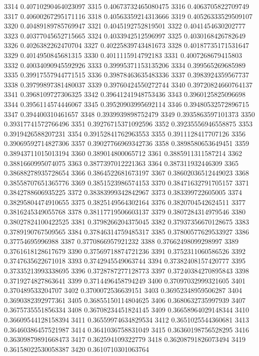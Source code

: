 3314 0.40710290464023097
3315 0.40673732465080475
3316 0.4063705822709749
3317 0.40600267295171116
3318 0.40563359214313666
3319 0.40526333529509107
3320 0.40489189785769947
3321 0.4045192752819501
3322 0.4041454630202777
3323 0.40377045652715665
3324 0.4033942512596997
3325 0.4030168426782649
3326 0.4026382262470704
3327 0.40225839743481673
3328 0.40187735171531647
3329 0.4014950845681315
3330 0.4011115914792183
3331 0.4007268679415803
3332 0.40034090945592926
3333 0.39995371153135206
3334 0.399565269685989
3335 0.39917557944771515
3336 0.39878463635483336
3337 0.3983924359567737
3338 0.39799897381480037
3339 0.39760424550272744
3340 0.39720824660764137
3341 0.3968109727306325
3342 0.39641241948753436
3343 0.3960125825096698
3344 0.3956114574446067
3345 0.39520903995692114
3346 0.39480532572896715
3347 0.394400310461657
3348 0.3939939898752479
3349 0.3935863597101373
3350 0.39317741572766496
3351 0.39276715371092596
3352 0.39235556946558875
3353 0.3919426588207231
3354 0.39152841762963553
3355 0.3911128417707126
3356 0.39069592714827306
3357 0.39027766969342736
3358 0.3898580653649451
3359 0.38943711015013194
3360 0.389014800065712
3361 0.3885911311587214
3362 0.3881660995074075
3363 0.3877397012221363
3364 0.387311932446309
3365 0.38688278935728654
3366 0.3864522681673197
3367 0.38602036512449023
3368 0.38558707651365776
3369 0.3851523986574153
3370 0.38471632791705157
3371 0.3842788606935225
3372 0.38383999342842967
3373 0.383399722605005
3374 0.38295804474910655
3375 0.3825149564302164
3376 0.3820704542624511
3377 0.3816245349055768
3378 0.38117719506603137
3379 0.3807284314979546
3380 0.38027824100422525
3381 0.3798266204375045
3382 0.37937356670128675
3383 0.3789190767509565
3384 0.37846314759485317
3385 0.37800577629533927
3386 0.37754695996988
3387 0.3770866957921232
3388 0.37662498099298997
3389 0.3761618128617679
3390 0.37569718874721236
3391 0.3752311060586526
3392 0.3747635622671018
3393 0.3742945549063744
3394 0.37382408157420777
3395 0.37335213993338695
3396 0.3728787277128773
3397 0.37240384270895843
3398 0.3719274827863641
3399 0.3714496458794249
3400 0.37097032999321605
3401 0.370489533204707
3402 0.3700072536639151
3403 0.36952348959506287
3404 0.3690382392977361
3405 0.36855150114804625
3406 0.3680632735997939
3407 0.3675735551856334
3408 0.36708234451824145
3409 0.36658964029148344
3410 0.36609544128158394
3411 0.36559974634829534
3412 0.3651025544360681
3413 0.36460386457521987
3414 0.3641036758831049
3415 0.36360198756528295
3416 0.36309879891668473
3417 0.362594109322779
3418 0.36208791826073494
3419 0.36158022530058387
3420 0.3610710301063764
